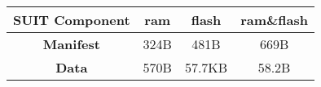 \documentclass{standalone}
\begin{document}
\begin{table}[ht]
\centering
\begin{tabular}[t]{cccc}
\hline\hline
\textbf{SUIT Component} & ram   & flash   & ram\&flash \\ \hline
\textbf{Manifest}       & 324B  & 481B    & 669B       \\
\textbf{Data}           & 570B  & 57.7KB  & 58.2B      \\ \hline
\end{tabular}%
\end{table}
\end{document}
